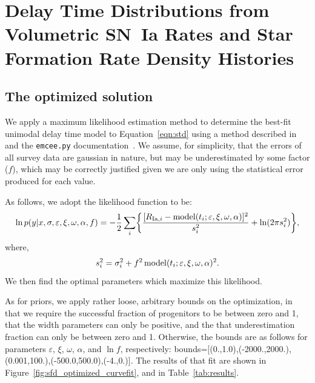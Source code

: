 \documentclass[apj]{aastex}
\begin{document}
\section{Delay Time Distributions from Volumetric SN~Ia Rates and Star Formation Rate Density Histories}

\subsection{The optimized solution}
We apply a maximum likelihood estimation method to determine the best-fit unimodal delay time model to Equation~\ref{eqn:std} using a method described in \cite{Hogg:2010fj} and the {\tt emcee.py} documentation~\citep{Foreman-Mackey:2013pd}. We assume, for simplicity, that the errors of all survey data are gaussian in nature, but may be underestimated by some factor ($f$), which may be correctly justified given we are only using the statistical error produced for each value. 
	
As follows, we adopt the likelihood function to be:
\begin{equation}
\ln p(y|x, \sigma, \varepsilon, \xi, \omega, \alpha, f) = -\frac{1}{2} \sum_i \biggl\{ \frac{[R_{{\rm Ia},i} - {\rm model}(t_i; \varepsilon, \xi, \omega, \alpha)]^2}{s_i^2}+\ln (2\pi s_i^2)\biggr\},
\end{equation}
where,
\begin{equation}
s_i^2 = \sigma_i^2+f^2\, {\rm model}(t_i; \varepsilon, \xi, \omega, \alpha)^2.
\end{equation}
We then find the optimal parameters which maximize this likelihood.


As for priors, we apply rather loose, arbitrary bounds on the optimization, in that we require the successful fraction of progenitors to be between zero and 1, that the width parameters can only be positive, and the that underestimation fraction can only be between zero and 1. Otherwise, the bounds are as follows for parameters $\varepsilon$, $\xi$, $\omega$, $\alpha$, and $\ln f$, respectively:  bounds=[(0.,1.0),(-2000.,2000.),(0.001,100.),(-500.0,500.0),(-4.,0.)]. The results of that fit are shown in Figure~\ref{fig:sfd_optimized_curvefit}, and in Table~\ref{tab:results}. 
\end{document}
